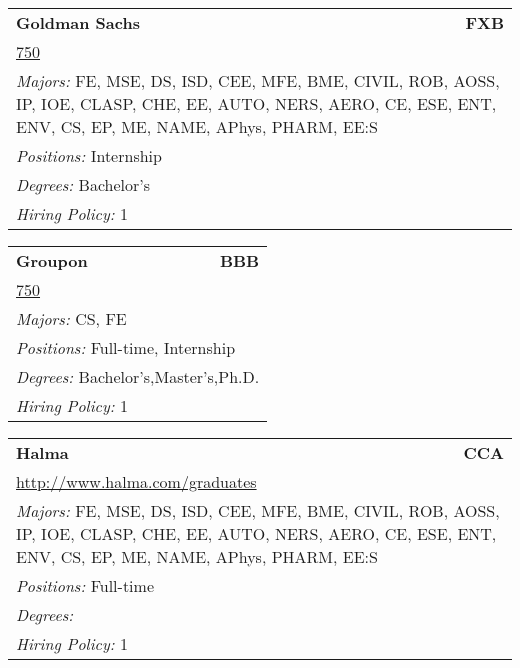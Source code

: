 \documentclass[twoside]{article}
\begin{document}
\begin{center}
\begin{multicols}{3}
\begin{FlushLeft}
\begin{minipage}{.9\columnwidth}\begin{tabularx}{.95\columnwidth}{Xr}
                 {\Large\bf Goldman Sachs} & {\Large\bf FXB}\\
    \multicolumn{2}{p{.95\columnwidth}}{\url{750}}\\
    \multicolumn{2}{p{.95\columnwidth}}{\emph{Majors:} FE, MSE, DS, ISD, CEE, MFE, BME, CIVIL, ROB, AOSS, IP, IOE, CLASP, CHE, EE, AUTO, NERS, AERO, CE, ESE, ENT, ENV, CS, EP, ME, NAME, APhys, PHARM, EE:S}\\
    \multicolumn{2}{p{.95\columnwidth}}{\emph{Positions:} Internship}\\
    \multicolumn{2}{p{.95\columnwidth}}{\emph{Degrees:} Bachelor's}\\
    \multicolumn{2}{p{.95\columnwidth}}{\emph{Hiring Policy:} 1}\\
    \end{tabularx}
    
\end{minipage}
 
\begin{minipage}{.9\columnwidth}\begin{tabularx}{.95\columnwidth}{Xr}
                 {\Large\bf Groupon} & {\Large\bf BBB}\\
    \multicolumn{2}{p{.95\columnwidth}}{\url{750}}\\
    \multicolumn{2}{p{.95\columnwidth}}{\emph{Majors:} CS, FE}\\
    \multicolumn{2}{p{.95\columnwidth}}{\emph{Positions:} Full-time, Internship}\\
    \multicolumn{2}{p{.95\columnwidth}}{\emph{Degrees:} Bachelor's,Master's,Ph.D.}\\
    \multicolumn{2}{p{.95\columnwidth}}{\emph{Hiring Policy:} 1}\\
    \end{tabularx}
    
\end{minipage}
 
\begin{minipage}{.9\columnwidth}\begin{tabularx}{.95\columnwidth}{Xr}
                 {\Large\bf Halma} & {\Large\bf CCA}\\
    \multicolumn{2}{p{.95\columnwidth}}{\url{http://www.halma.com/graduates}}\\
    \multicolumn{2}{p{.95\columnwidth}}{\emph{Majors:} FE, MSE, DS, ISD, CEE, MFE, BME, CIVIL, ROB, AOSS, IP, IOE, CLASP, CHE, EE, AUTO, NERS, AERO, CE, ESE, ENT, ENV, CS, EP, ME, NAME, APhys, PHARM, EE:S}\\
    \multicolumn{2}{p{.95\columnwidth}}{\emph{Positions:} Full-time}\\
    \multicolumn{2}{p{.95\columnwidth}}{\emph{Degrees:} }\\
    \multicolumn{2}{p{.95\columnwidth}}{\emph{Hiring Policy:} 1}\\
    \end{tabularx}
    

\end{minipage}
\end{FlushLeft}
\end{multicols}
\end{center}
\end{document}
